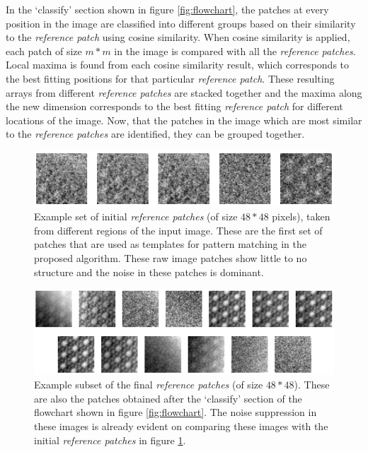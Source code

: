 \documentclass[fleqn,10pt]{wlscirep}
\begin{document}
	
	In the `classify' section shown in figure \ref{fig:flowchart}, the patches at every position in the image are classified into different groups based on their similarity to the \textit{reference patch} using cosine similarity. When cosine similarity is applied, each patch of size $m*m$ in the image is compared with all the \textit{reference patches}. Local maxima is found from each cosine similarity result, which corresponds to the best fitting positions for that particular \textit{reference patch}. These resulting arrays from different \textit{reference patches} are stacked together and the maxima along the new dimension corresponds to the best fitting \textit{reference patch} for different locations of the image. Now, that the patches in the image which are most similar to the \textit{reference patches} are identified, they can be grouped together.
	
	\vspace{1cm }
	
	\begin{figure}[H]
		\centering
		\includegraphics[scale=0.85]{./imgs/initial_reference_patches.png}
		\caption{Example set of initial \textit{reference patches} (of size $48*48$ pixels), taken from different regions of the input image. These are the first set of patches that are used as templates for pattern matching in the proposed algorithm. These raw image patches show little to no structure and the noise in these patches is dominant. }
		\label{fig:initial_reference_patches}
	\end{figure} 
	
	\begin{figure}[H]
		\centering
		\includegraphics[scale=1.2]{./imgs/final_reference_patches.png}
		\caption{Example subset of the final \textit{reference patches} (of size $48*48$). These are also the patches obtained after the `classify' section of the flowchart shown in figure \ref{fig:flowchart}. The noise suppression in these images is already evident on comparing these images with the initial \textit{reference patches} in figure \ref{fig:initial_reference_patches}.}
		\label{fig:final_reference_patches}
	\end{figure} 
	
\end{document}
